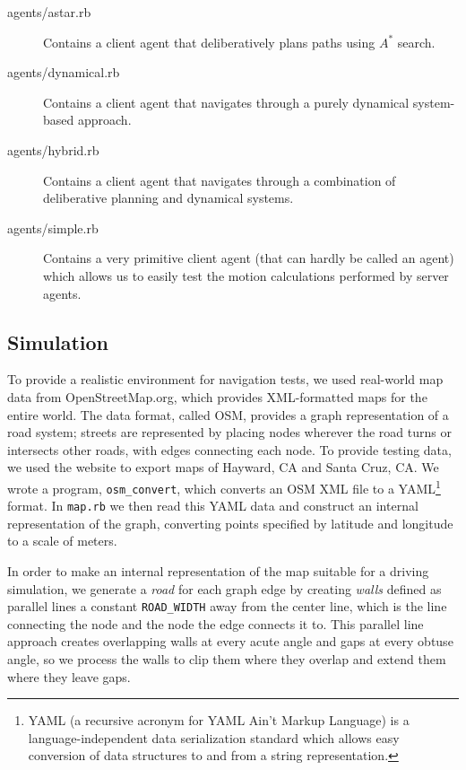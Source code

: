 \documentclass{article}
\newcommand{\code}{\texttt}
\begin{document}
\begin{description}
\item[agents/astar.rb] Contains a client agent that deliberatively
  plans paths using $A^*$ search.

\item[agents/dynamical.rb] Contains a client agent that navigates
  through a purely dynamical system-based approach.

\item[agents/hybrid.rb] Contains a client agent that navigates through
  a combination of deliberative planning and dynamical systems.

\item[agents/simple.rb] Contains a very primitive client agent (that
  can hardly be called an agent) which allows us to easily test the
  motion calculations performed by server agents.

\end{description}

\subsection{Simulation}
To provide a realistic environment for navigation tests, we used real-world map
data from OpenStreetMap.org, which provides XML-formatted maps for the entire
world. The data format, called OSM, provides a graph representation of a road
system; streets are represented by placing nodes wherever the road turns or
intersects other roads, with edges connecting each node. To provide testing
data, we used the website to export maps of Hayward, CA and Santa Cruz, CA. We
wrote a program, \code{osm\_convert}, which converts an OSM XML file to a
YAML\footnote{YAML (a recursive acronym for YAML Ain't Markup Language) is a
  language-independent data serialization standard which allows easy conversion
  of data structures to and from a string representation.} format. In
\code{map.rb} we then read this YAML data and construct an internal
representation of the graph, converting points specified by latitude and
longitude to a scale of meters.

In order to make an internal representation of the map suitable for a driving
simulation, we generate a \emph{road} for each graph edge by creating
\emph{walls} defined as parallel lines a constant \code{ROAD\_WIDTH} away from
the center line, which is the line connecting the node and the node the edge
connects it to. This parallel line approach creates overlapping walls at every
acute angle and gaps at every obtuse angle, so we process the walls to clip them
where they overlap and extend them where they leave gaps.
\end{document}
